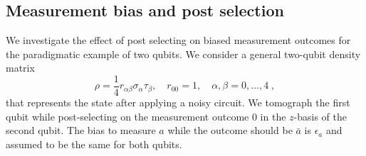 \documentclass[a4paper,twocolumn,11pt, accepted=2024-06-14]{quantumarticle}
\begin{document}
 
\subsection{Measurement bias and post selection}\label{app:bias} We investigate the effect of post selecting on biased measurement outcomes for the paradigmatic example of two qubits. We consider a general two-qubit density matrix
\begin{equation}
	\rho=\frac{1}{4} r_{\alpha \beta} \sigma_\alpha \tau_\beta,\quad r_{00}=1,\quad \alpha,\beta=0,\ldots,4\;,
\end{equation} that represents the state after applying a noisy circuit. We tomograph the first qubit while post-selecting on the measurement outcome $0$ in the $z$-basis of the second qubit. The bias to measure $a$ while the outcome should be $\bar a$ is $\epsilon_a$ and assumed to be the same for both qubits. 
\end{document}
